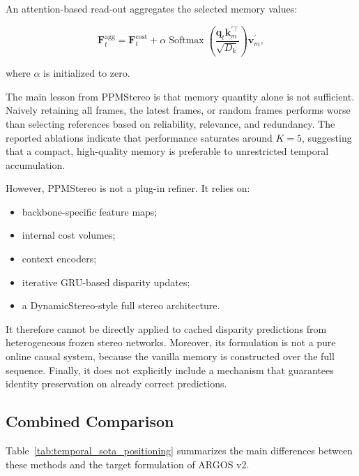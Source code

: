 \documentclass[11pt,a4paper]{article}
\begin{document}
An attention-based read-out aggregates the selected memory values:

\begin{equation}
\mathbf{F}_{t}^{\mathrm{agg}}
=
\mathbf{F}_{t}^{\mathrm{cost}}
+
\alpha
\operatorname{Softmax}
\left(
\frac{
\mathbf{q}_t
\mathbf{k}_m^{\prime\top}
}{
\sqrt{D_k}
}
\right)
\mathbf{v}_m^{\prime},
\end{equation}

where $\alpha$ is initialized to zero.

The main lesson from PPMStereo is that memory quantity alone is not sufficient. Naively retaining all frames, the latest frames, or random frames performs worse than selecting references based on reliability, relevance, and redundancy. The reported ablations indicate that performance saturates around $K=5$, suggesting that a compact, high-quality memory is preferable to unrestricted temporal accumulation.

However, PPMStereo is not a plug-in refiner. It relies on:

\begin{itemize}
    \item backbone-specific feature maps;
    \item internal cost volumes;
    \item context encoders;
    \item iterative GRU-based disparity updates;
    \item a DynamicStereo-style full stereo architecture.
\end{itemize}

It therefore cannot be directly applied to cached disparity predictions from heterogeneous frozen stereo networks. Moreover, its formulation is not a pure online causal system, because the vanilla memory is constructed over the full sequence. Finally, it does not explicitly include a mechanism that guarantees identity preservation on already correct predictions.

\subsection{Combined Comparison}

Table~\ref{tab:temporal_sota_positioning} summarizes the main differences between these methods and the target formulation of ARGOS v2.
\end{document}
